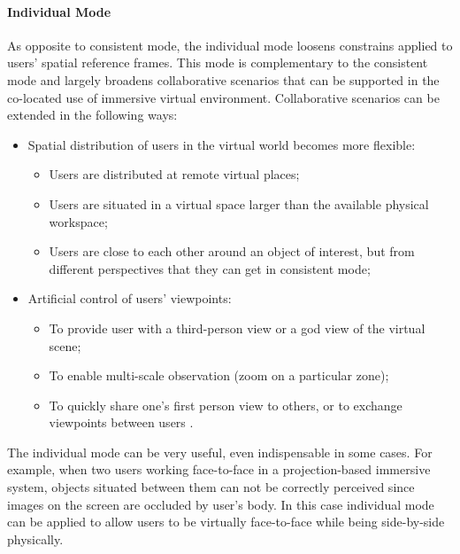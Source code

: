 \paragraph{Individual Mode}
As opposite to consistent mode, the individual mode loosens constrains applied to users' spatial reference frames. This mode is complementary to the consistent mode and largely broadens collaborative scenarios that can be supported in the co-located use of immersive virtual environment. Collaborative scenarios can be extended in the following ways:

\begin{itemize}
\item Spatial distribution of users in the virtual world becomes more flexible:
\begin{itemize}
  \item Users are distributed at remote virtual places;
  \item Users are situated in a virtual space larger than the available physical workspace;
  \item Users are close to each other around an object of interest, but from different perspectives that they can get in consistent mode;
\end{itemize}
\item Artificial control of users' viewpoints:
\begin{itemize}
  \item To provide user with a third-person view or a god view of the virtual scene;
  \item To enable multi-scale observation (zoom on a particular zone);
  \item To quickly share one's first person view to others, or to exchange viewpoints between users \citep{Lopez2014Exchange}.
\end{itemize}
\end{itemize}

The individual mode can be very useful, even indispensable in some cases. For example, when two users working face-to-face in a projection-based immersive system, objects situated between them can not be correctly perceived since images on the screen are occluded by user's body. In this case individual mode can be applied to allow users to be virtually face-to-face while being side-by-side physically.

